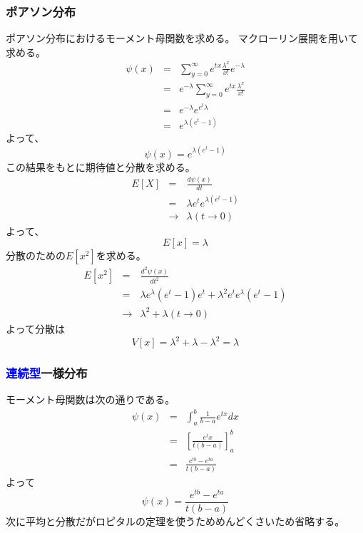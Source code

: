 \documentclass[a4paper,10pt]{jarticle}
\begin{document}
\subsubsection{ポアソン分布}
ポアソン分布におけるモーメント母関数を求める。
マクローリン展開を用いて求める。
\begin{eqnarray*}
    \psi(x) &=& \sum_{y=0}^\infty e^{tx}\frac{\lambda^x}{x!}e^{-\lambda}\\
    &=& e^{-\lambda}\sum_{y=0}^\infty e^{tx}\frac{\lambda^x}{x!}\\
    &=& e^{-\lambda} e^{e^t\lambda}\\
    &=& e^{\lambda(e^t-1)}
\end{eqnarray*}
よって、
\begin{equation}
    \psi(x) = e^{\lambda(e^t-1)}\tag{3,30}
\end{equation}
この結果をもとに期待値と分散を求める。
\begin{eqnarray*}
    E[X] &=& \frac{d\psi(x)}{dt}\\
    &=&  \lambda e^t e^{\lambda(e^t-1)}\\
    &\rightarrow& \lambda(t\rightarrow 0)
\end{eqnarray*}
よって、
\begin{equation}
    E[x] = \lambda \tag{3,31}
\end{equation}
分散のための$E[x^2]$を求める。
\begin{eqnarray*}
    E[x^2] &=& \frac{d^2\psi(x)}{dt^2}\\
        &=& \lambda e^\lambda(e^t-1)e^t + \lambda^2e^te^\lambda(e^t-1)\\
        &\rightarrow& \lambda^2 + \lambda (t\rightarrow 0)
\end{eqnarray*}
よって分散は
\begin{equation}
    V[x]=\lambda^2+\lambda -\lambda^2 =\lambda \tag{3,32}
\end{equation}
\subsubsection{\textcolor{blue}{連続型}一様分布}

モーメント母関数は次の通りである。
\begin{eqnarray*}
    \psi(x) &=& \int_a^b \frac{1}{b-a}e^{tx}dx\\
    &=& \left[\frac{e^tx}{t(b-a)}\right]_a^b\\
    &=& \frac{e^{tb}-e^{ta}}{t(b-a)}
\end{eqnarray*}
よって
\begin{equation}
    \psi(x) = \frac{e^{tb}-e^{ta}}{t(b-a)}\tag{3,31}
\end{equation}
次に平均と分散だがロピタルの定理を使うためめんどくさいため省略する。
\end{document}
